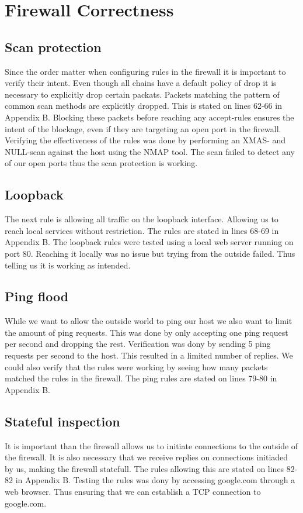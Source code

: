 \section{Firewall Correctness}
\label{sec:correctness}

\subsection{Scan protection}
Since the order matter when configuring rules in the firewall it is important to verify their intent. Even though all chains have a default policy of drop it is necessary to explicitly drop certain packats. Packets matching the pattern of common scan methods are explicitly dropped. This is stated on lines 62-66 in Appendix B. Blocking these packets before reaching any accept-rules ensures the intent of the blockage, even if they are targeting an open port in the firewall. Verifying the effectiveness of the rules was done by performing an XMAS- and NULL-scan against the host using the NMAP tool. The scan failed to detect any of our open ports thus the scan protection is working.

\subsection{Loopback}
The next rule is allowing all traffic on the loopback interface. Allowing us to reach local services without restriction. The rules are stated in lines 68-69 in Appendix B. The loopback rules were tested using a local web server running on port 80. Reaching it locally was no issue but trying from the outside failed. Thus telling us it is working as intended.

\subsection{Ping flood}
While we want to allow the outside world to ping our host we also want to limit the amount of ping requests. This was done by only accepting one ping request per second and dropping the rest. Verification was dony by sending 5 ping requests per second to the host. This resulted in a limited number of replies. We could also verify that the rules were working by seeing how many packets matched the rules in the firewall. The ping rules are stated on lines 79-80 in Appendix B.

\subsection{Stateful inspection}
It is important than the firewall allows us to initiate connections to the outside of the firewall. It is also necessary that we receive replies on connections initiaded by us, making the firewall statefull. The rules allowing this are stated on lines 82-82 in Appendix B. Testing the rules was dony by accessing google.com through a web browser. Thus ensuring that we can establish a TCP connection to google.com.

